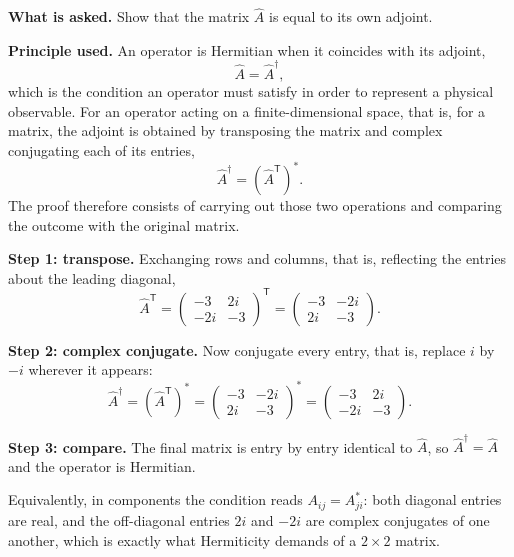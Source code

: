 \documentclass[12pt]{article}
\newif\ifsolutions
\begin{document}
\ifsolutions
\begin{solutionbox}
\textbf{What is asked.} Show that the matrix $\hat{A}$ is equal to its own adjoint.

\textbf{Principle used.} An operator is Hermitian when it coincides with its adjoint,
\[
    \hat{A}=\hat{A}^{\dagger},
\]
which is the condition an operator must satisfy in order to represent a physical observable. For an operator acting on a finite-dimensional space, that is, for a matrix, the adjoint is obtained by transposing the matrix and complex conjugating each of its entries,
\[
    \hat{A}^{\dagger}=\left(\hat{A}^{\mathsf{T}}\right)^{*}.
\]
The proof therefore consists of carrying out those two operations and comparing the outcome with the original matrix.

\textbf{Step 1: transpose.} Exchanging rows and columns, that is, reflecting the entries about the leading diagonal,
\[
    \hat{A}^{\mathsf{T}}
    =\begin{pmatrix} -3 & 2i \\ -2i & -3 \end{pmatrix}^{\mathsf{T}}
    =\begin{pmatrix} -3 & -2i \\ 2i & -3 \end{pmatrix}.
\]

\textbf{Step 2: complex conjugate.} Now conjugate every entry, that is, replace $i$ by $-i$ wherever it appears:
\[
    \hat{A}^{\dagger}=\left(\hat{A}^{\mathsf{T}}\right)^{*}
    =\begin{pmatrix} -3 & -2i \\ 2i & -3 \end{pmatrix}^{*}
    =\begin{pmatrix} -3 & 2i \\ -2i & -3 \end{pmatrix}.
\]

\textbf{Step 3: compare.} The final matrix is entry by entry identical to $\hat{A}$, so $\hat{A}^{\dagger}=\hat{A}$ and the operator is Hermitian.

Equivalently, in components the condition reads $A_{ij}=A_{ji}^{*}$: both diagonal entries are real, and the off-diagonal entries $2i$ and $-2i$ are complex conjugates of one another, which is exactly what Hermiticity demands of a $2\times 2$ matrix.


\end{solutionbox}
\end{document}
